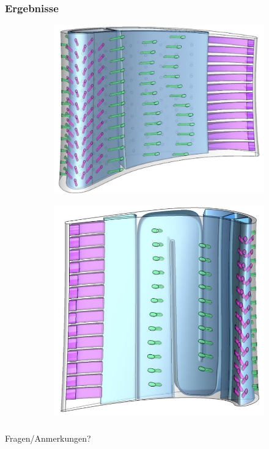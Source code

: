\documentclass[8pt, aspectratio=169]{beamer}
\begin{document}
\begin{frame}
	\frametitle{Ergebnisse}
	\vspace{-1cm}\hspace{-0.5cm}
	\begin{figure}
		\centering
		\begin{subfigure}[t]{.49\textwidth}
			\centering
			\includegraphics[height=.6\textheight]{../tec/complete/17.png}
		\end{subfigure}
		\begin{subfigure}[t]{.49\textwidth}
			\centering
			\includegraphics[height=.6\textheight]{../tec/complete/18.png}
		\end{subfigure}
	\end{figure}
	\vfill
\end{frame}

\begin{frame}
	\frametitle{}
	\begin{minipage}[t]{\textwidth}
		\centering
		\Large Fragen/Anmerkungen?
	\end{minipage}
\end{frame}
\end{document}
